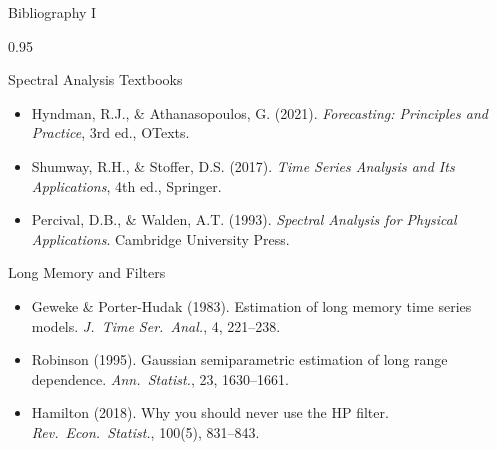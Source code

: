 \documentclass[9pt, aspectratio=169, t]{beamer}
\begin{document}
\begin{frame}{Bibliography I}
    \begin{cminipage}{0.95\textwidth}
    \begin{block}{Spectral Analysis Textbooks}
        {\small
        \begin{itemize}\setlength{\itemsep}{0pt}
            \item Hyndman, R.J., \& Athanasopoulos, G. (2021). \textit{Forecasting: Principles and Practice}, 3rd ed., OTexts.
            \item Shumway, R.H., \& Stoffer, D.S. (2017). \textit{Time Series Analysis and Its Applications}, 4th ed., Springer.
            \item Percival, D.B., \& Walden, A.T. (1993). \textit{Spectral Analysis for Physical Applications}. Cambridge University Press.
        \end{itemize}
        }
    \end{block}

    \begin{exampleblock}{Long Memory and Filters}
        {\small
        \begin{itemize}\setlength{\itemsep}{0pt}
            \item Geweke \& Porter-Hudak (1983). Estimation of long memory time series models. \textit{J.\ Time Ser.\ Anal.}, 4, 221--238.
            \item Robinson (1995). Gaussian semiparametric estimation of long range dependence. \textit{Ann.\ Statist.}, 23, 1630--1661.
            \item Hamilton (2018). Why you should never use the HP filter. \textit{Rev.\ Econ.\ Statist.}, 100(5), 831--843.
        \end{itemize}
        }
    \end{exampleblock}
    \end{cminipage}
\end{frame}
\end{document}
